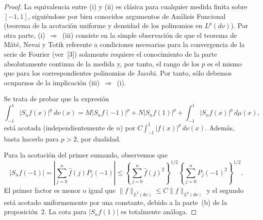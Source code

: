 \documentclass[a4paper,12pt]{article}
\theoremstyle{plain}
\theoremstyle{definition}
\begin{document}
\begin{proof}
La equivalencia entre (i) y (ii) es cl\'asica para cualquier
medida finita sobre $[-1,1]$, sigui\'endose por bien conocidos
argumentos de An\'alisis Funcional (teorema de la acotaci\'on
uniforme y densidad de los polinomios en $L^{p}(d\nu)$). Por
otra parte, (i)~$\Rightarrow$~(iii) consiste en la simple observaci\'on
de que el teorema de M\'at\'e, Nevai y Totik referente a condiciones
necesarias para la convergencia de la serie de Fourier (ver~[3])
solamente requiere el conocimiento de la parte absolutamente
continua de la medida y, por tanto, el rango de los $p$ es el mismo
que para los correspondientes polinomios de Jacobi. Por tanto,
s\'olo debemos ocuparnos de la implicaci\'on
(iii)~$\Rightarrow$~(i).

Se trata de probar que la expresi\'on
$$
\int_{-1}^1 |S_{n}f(x)|^{p}\,d\nu(x) = M|S_{n}f(-1)|^{p}
+ N|S_{n}f(1)|^{p} + \int_{-1}^1 |S_{n}f(x)|^{p}\,d\mu(x),
$$
est\'a acotada (independientemente de $n$) por
$C \int_{-1}^1 |f(x)|^{p}\,d\nu(x)$.
Adem\'as, basta hacerlo para $p > 2$,
por dualidad.

Para la acotaci\'on del primer sumando, observemos que
$$
|S_{n}f(-1)| = \left|\sum_{j=0}^n \widehat{f}(j)P_{j}(-1)\right|
\leq \left\{\sum_{j=0}^n \widehat{f}(j)^{2}\right\}^{1/2}
\left\{\sum_{j=0}^n P_{j}(-1)^{2}\right\}^{1/2}.
$$
El primer factor es menor o igual que $\|f\|_{L^2(d\nu)}
\leq C \|f\|_{L^p(d\nu)}$ y el
segundo est\'a acotado uniformemente por una constante, debido
a la parte~(b) de la proposici\'on~2.
La cota para $|S_{n}f(1)|$ es totalmente an\'aloga.


\end{proof}
\end{document}
